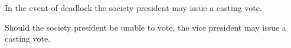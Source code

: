 \begin{clause}
    In the event of deadlock the society president may issue a casting vote.
\end{clause}

\begin{subclause}
    Should the society president be unable to vote, the vice president may issue a casting vote.
\end{subclause}